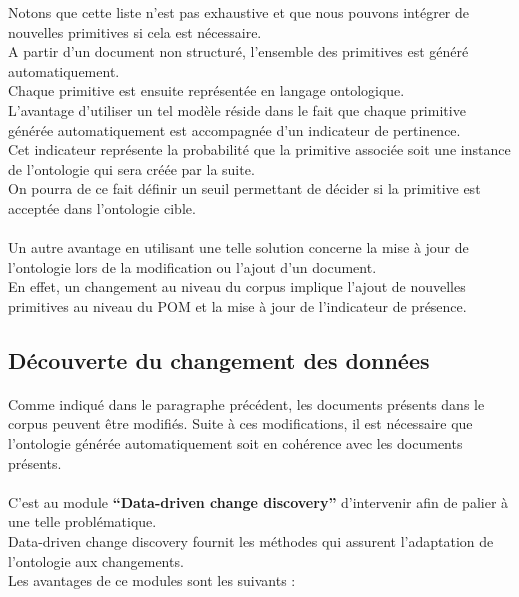 \documentclass[12pt, a4paper, oneside]{book}
\begin{document}
Notons que cette liste n'est pas exhaustive et que nous pouvons intégrer de nouvelles primitives si cela est nécessaire.\\
A partir d'un document non structuré, l'ensemble des primitives est généré automatiquement.\\
Chaque primitive est ensuite représentée en langage ontologique.\\

L'avantage d'utiliser un tel modèle réside dans le fait que chaque primitive générée automatiquement est accompagnée d'un indicateur de pertinence. \\
Cet indicateur représente la probabilité que la primitive associée soit une instance de l'ontologie qui sera créée par la suite.\\
On pourra de ce fait définir un seuil permettant de décider si la primitive est acceptée dans l'ontologie cible.
\paragraph{}
Un autre avantage en utilisant une telle solution concerne la mise à jour de l'ontologie lors de la modification ou l'ajout d'un document.\\En effet, un changement au niveau du corpus implique l'ajout de nouvelles primitives au niveau du POM et la mise à jour de l'indicateur de présence.

\subsection{Découverte du changement des données}
\paragraph{}
Comme indiqué dans le paragraphe précédent, les documents présents dans le corpus peuvent être modifiés.
Suite à ces modifications, il est nécessaire que l'ontologie générée automatiquement soit en cohérence avec les documents présents.
\paragraph{}
C'est au module \textbf{“Data-driven change discovery”} d'intervenir afin de palier à une telle problématique.\\
Data-driven change discovery fournit les méthodes qui assurent l'adaptation de l'ontologie aux changements.\\
Les avantages de ce modules sont les suivants : \\
\end{document}
